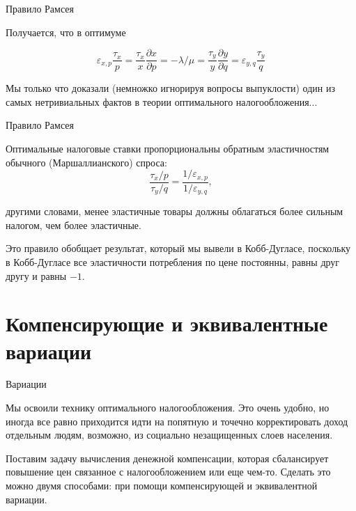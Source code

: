 \documentclass{beamer}
\begin{document}
\begin{frame}{Правило Рамсея}

Получается, что в оптимуме

$$ \varepsilon_{x,p}\frac{\tau_{x}}{p} = \frac{\tau_x}{x} \frac{\partial x}{\partial p} = - \lambda / \mu = \frac{\tau_y}{y} \frac{\partial y}{\partial q} = \varepsilon_{y,q}\frac{\tau_{y}}{q}$$

Мы только что доказали (немножко игнорируя вопросы выпуклости) один из самых нетривиальных фактов в теории оптимального налогообложения...

\end{frame}

\begin{frame}{Правило Рамсея}

\begin{lemma}
Оптимальные налоговые ставки пропорциональны обратным эластичностям обычного (Маршаллианского) спроса:
$$ \frac{\tau_x/p}{\tau_y/q} = \frac{1/\varepsilon_{x,p}}{1/\varepsilon_{y,q}},$$

другими словами, менее эластичные товары должны облагаться более сильным налогом, чем более эластичные.
\end{lemma}

Это правило обобщает результат, который мы вывели в Кобб-Дугласе, поскольку в Кобб-Дугласе все эластичности потребления по цене постоянны, равны друг другу и равны $-1$.

\end{frame}

\section{Компенсирующие и эквивалентные вариации}

\begin{frame}{Вариации}

Мы освоили технику оптимального налогообложения. Это очень удобно, но иногда все равно приходится идти на попятную и точечно корректировать доход отдельным людям, возможно, из социально незащищенных слоев населения.

Поставим задачу вычисления денежной компенсации, которая сбалансирует повышение цен связанное с налогообложением или еще чем-то. Сделать это можно двумя способами: при помощи компенсирующей и эквивалентной вариации.

\end{frame}
\end{document}
